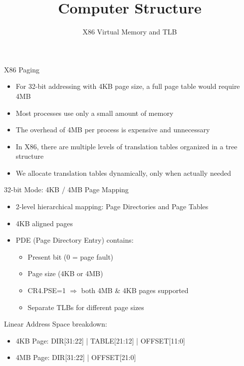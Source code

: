 \documentclass[aspectratio=169,12pt]{beamer}
\title{Computer Structure}
\subtitle{X86 Virtual Memory and TLB}
\author{}
\date{}
\begin{document}
\begin{frame}
\titlepage
\end{frame}

\begin{frame}{X86 Paging}
\begin{itemize}
    \item For 32-bit addressing with 4KB page size, a full page table would require 4MB
    \item Most processes use only a small amount of memory
    \item The overhead of 4MB per process is expensive and unnecessary
    \item In X86, there are multiple levels of translation tables organized in a tree structure
    \item We allocate translation tables dynamically, only when actually needed
\end{itemize}
\end{frame}

\begin{frame}{32-bit Mode: 4KB / 4MB Page Mapping}
\begin{itemize}
    \item 2-level hierarchical mapping: Page Directories and Page Tables
    \item 4KB aligned pages
    \item PDE (Page Directory Entry) contains:
    \begin{itemize}
        \item Present bit (0 = page fault)
        \item Page size (4KB or 4MB)
        \item CR4.PSE=1 $\Rightarrow$ both 4MB \& 4KB pages supported
        \item Separate TLBs for different page sizes
    \end{itemize}
\end{itemize}

\vspace{1em}
Linear Address Space breakdown:
\begin{itemize}
    \item 4KB Page: DIR[31:22] | TABLE[21:12] | OFFSET[11:0]
    \item 4MB Page: DIR[31:22] | OFFSET[21:0]
\end{itemize}
\end{frame}
\end{document}
